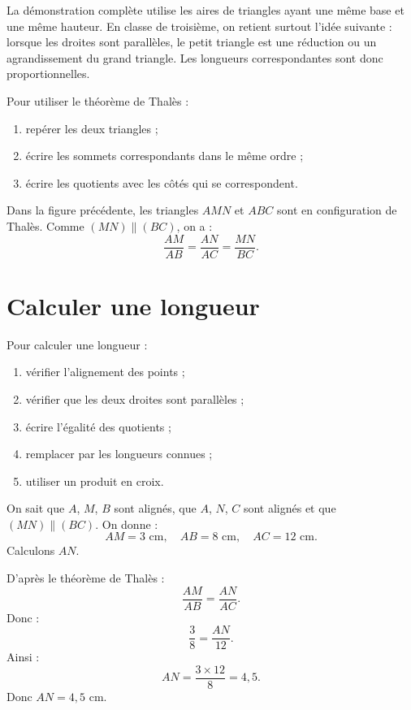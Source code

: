 \documentclass[a4paper,10pt]{report}
\begin{document}
\begin{demo}
La démonstration complète utilise les aires de triangles ayant une même base et une même hauteur.
En classe de troisième, on retient surtout l'idée suivante : lorsque les droites sont parallèles, le petit triangle est une réduction ou un agrandissement du grand triangle.
Les longueurs correspondantes sont donc proportionnelles.
\end{demo}

\begin{meth}
Pour utiliser le théorème de Thalès :
\begin{enumerate}
\item repérer les deux triangles ;
\item écrire les sommets correspondants dans le même ordre ;
\item écrire les quotients avec les côtés qui se correspondent.
\end{enumerate}
\end{meth}

\begin{ex}
Dans la figure précédente, les triangles $AMN$ et $ABC$ sont en configuration de Thalès.
Comme $(MN)\parallel(BC)$, on a :
\[
\dfrac{AM}{AB}=\dfrac{AN}{AC}=\dfrac{MN}{BC}.
\]
\end{ex}

\section{Calculer une longueur}

\begin{meth}
Pour calculer une longueur :
\begin{enumerate}
\item vérifier l'alignement des points ;
\item vérifier que les deux droites sont parallèles ;
\item écrire l'égalité des quotients ;
\item remplacer par les longueurs connues ;
\item utiliser un produit en croix.
\end{enumerate}
\end{meth}

\begin{ex}
On sait que $A$, $M$, $B$ sont alignés, que $A$, $N$, $C$ sont alignés et que $(MN)\parallel(BC)$.
On donne :
\[
AM=3\text{ cm}, \quad AB=8\text{ cm}, \quad AC=12\text{ cm}.
\]
Calculons $AN$.

\medskip
D'après le théorème de Thalès :
\[
\dfrac{AM}{AB}=\dfrac{AN}{AC}.
\]
Donc :
\[
\dfrac{3}{8}=\dfrac{AN}{12}.
\]
Ainsi :
\[
AN=\dfrac{3\times 12}{8}=4,5.
\]
Donc $AN=4,5$ cm.
\end{ex}
\end{document}
